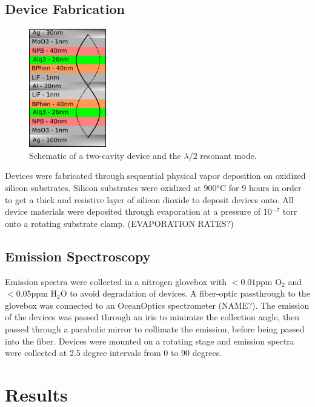 \documentclass{report}
\begin{document}
    \section{Device Fabrication} \label{fab}
    \begin{figure}
        \centering
        \includegraphics[width=0.3\textwidth]{images/schematic.png}
        \caption{\small Schematic of a two-cavity device and the $\lambda/2$ resonant mode.}
        \label{fig:schematic}
    \end{figure}
    Devices were fabricated through sequential physical vapor deposition on oxidized silicon substrates. Silicon substrates were oxidized at 900$^o$C for 9 hours in order to get a thick and resistive layer of silicon dioxide to deposit devices onto. All device materials were deposited through evaporation at a pressure of 10$^{-7}$ torr onto a rotating substrate clamp. (EVAPORATION RATES?)

    \section{Emission Spectroscopy} \label{spect}
    Emission spectra were collected in a nitrogen glovebox with $<0.01$ppm O$_2$ and $<0.05$ppm H$_2$O to avoid degradation of devices. A fiber-optic passthrough to the glovebox was connected to an OceanOptics spectrometer (NAME?). The emission of the devices was passed through an iris to minimize the collection angle, then passed through a parabolic mirror to collimate the emission, before being passed into the fiber. Devices were mounted on a rotating stage and emission spectra were collected at 2.5 degree intervals from 0 to 90 degrees.

\chapter{Results}
\end{document}
